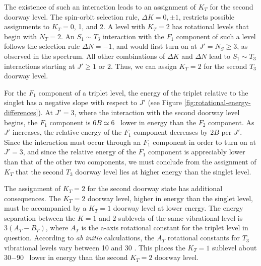 The existence of such an interaction leads to an assignment of $K_T$
for the second doorway level.  The spin-orbit selection rule, $\Delta K
= 0, \pm 1$, restricts possible assignments to $K_T=$0, 1, and 2.  A
level with $K_T=2$ has rotational levels that begin with $N_T=2$.  An
$S_1 \sim T_3$ interaction with the $F_1$ component of such a level
follows the selection rule $\Delta N = -1$, and would first turn on at
$J'=N_S \geq 3$, as observed in the spectrum.  All other combinations
of $\Delta K$ and $\Delta N$ lead to $S_1 \sim T_3$ interactions
starting at $J' \geq 1$ or $2$.  Thus, we can assign $K_T=2$ for the
second $T_3$ doorway level.

For the $F_1$ component of a triplet level, the energy of the triplet
relative to the singlet has a negative slope with respect to $J'$ (see
Figure \ref{fig:rotational-energy-differences}).  At $J'=3$, where the
interaction with the second doorway level begins, the $F_1$ component
is $6B \simeq 6$ \rcm\ lower in energy than the $F_2$ component.  As
$J'$ increases, the relative energy of the $F_1$ component decreases
by $2B$ per $J'$.  Since the interaction must occur through an $F_1$
component in order to turn on at $J'=3$, and since the relative energy
of the $F_1$ component is appreciably lower than that of the other two
components, we must conclude from the assignment of $K_T$ that the
second $T_3$ doorway level lies at higher energy than the singlet
level.

The assignment of $K_T=2$ for the second doorway state has additional
consequences.  The $K_T=2$ doorway level, higher in energy than the
singlet level, must be accompanied by a $K_T=1$ doorway level at lower
energy.  %
The energy separation
between the $K=1$ and $2$ sublevels of the same vibrational level is
$3(A_T-B_T)$, where $A_T$ is the a-axis rotational constant for the
triplet level in question.  According to \emph{ab initio}
calculations, the $A_T$ rotational constants for $T_3$ vibrational
levels vary between 10 and 30 \rcm \cite{thom07}.  This places the
$K_T=1$ sublevel about 30$-$90 \rcm\ lower in energy than the second
$K_T=2$ doorway level.


